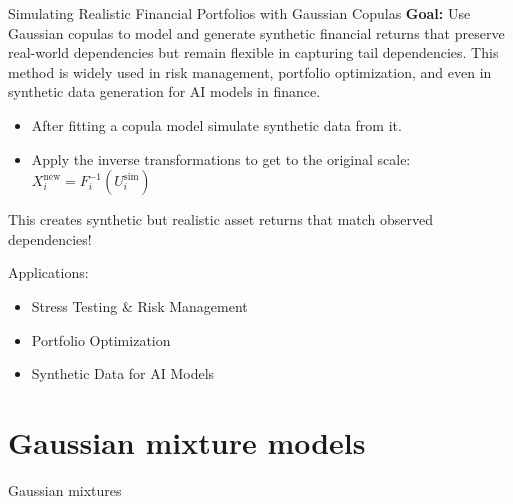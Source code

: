 \documentclass[11pt,handout,aspectratio=169]{beamer}
\begin{document}

\begin{frame}{Simulating Realistic Financial Portfolios with Gaussian Copulas}
	\textbf{Goal:}
Use Gaussian copulas to model and generate synthetic financial returns that preserve real-world dependencies but remain flexible in capturing tail dependencies. This method is widely used in risk management, portfolio optimization, and even in synthetic data generation for AI models in finance.
\begin{itemize}
	\item After fitting a copula model simulate synthetic data from it.
	\item Apply the inverse transformations to get to the original scale: $X_i^{\text{new}} = F_i^{-1}(U_i^{\text{sim}})$
\end{itemize}
This creates synthetic but realistic asset returns that match observed dependencies!
\begin{block}{Applications:}
\begin{itemize}
	\item Stress Testing \& Risk Management
	\item Portfolio Optimization
	\item Synthetic Data for AI Models
\end{itemize}
\end{block}
\end{frame}

\section{Gaussian mixture models}

\begin{frame}{}
	\begin{center}
		{\Huge \alert{Gaussian mixtures}}
	\end{center}
\end{frame}
\end{document}
